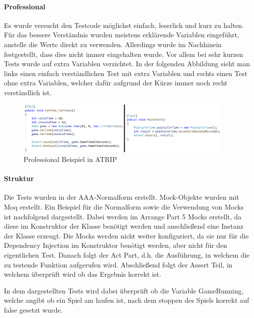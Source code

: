 \paragraph{Professional}
Es wurde versucht den Testcode möglichst einfach, leserlich und kurz zu halten. Für das bessere Verständnis wurden meistens erklärende Variablen eingeführt, anstelle die Werte direkt zu verwenden. Allerdings wurde im Nachhinein festgestellt, dass dies nicht immer eingehalten wurde. Vor allem bei sehr kurzen Tests wurde auf extra Variablen verzichtet. In der folgenden Abbildung sieht man links einen einfach verständlichen Test mit extra Variablen und rechts einen Test ohne extra Variablen, welcher dafür aufgrund der Kürze immer noch recht verständlich ist.

\begin{figure}[!htb]
\centering
\includegraphics[width=0.95\textwidth]{Bilder/professional_example.PNG}
\caption{\label{Abb:professional_example} Professional Beispiel in ATRIP}
\end{figure}


\paragraph{Struktur}
Die Tests wurden in der AAA-Normalform erstellt. Mock-Objekte wurden mit Moq erstellt. Ein Beispiel für die Normalform sowie die Verwendung von Mocks ist nachfolgend dargestellt. Dabei werden im \glqq Arrange\grqq{} Part 5 Mocks erstellt, da diese im Konstruktor der Klasse benötigt werden und anschließend eine Instanz der Klasse erzeugt. Die Mocks werden nicht weiter konfiguriert, da sie nur für die Dependency Injection im Konstruktor benötigt werden, aber nicht für den eigentlichen Test. Danach folgt der \glqq Act\grqq{} Part, d.h. die Ausführung, in welchem die zu testende Funktion aufgerufen wird. Abschließend folgt der \glqq Assert\grqq{} Teil, in welchem überprüft wird ob das Ergebnis korrekt ist.


In dem dargestellten Tests wird dabei überprüft ob die Variable \glqq GameRunning\grqq{}, welche angibt ob ein Spiel am laufen ist, nach dem stoppen des Spiels korrekt auf \glqq false\grqq{} gesetzt wurde.



